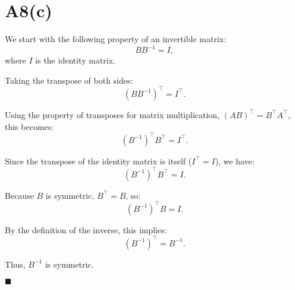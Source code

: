 \documentclass{article}
\begin{document}
\section*{A8(c)}

We start with the following property of an invertible matrix:
\[
B B^{-1} = I,
\]
where \( I \) is the identity matrix.

Taking the transpose of both sides:
\[
(B B^{-1})^\top = I^\top.
\]

Using the property of transposes for matrix multiplication, \( (AB)^\top = B^\top A^\top \), this becomes:
\[
(B^{-1})^\top B^\top = I^\top.
\]

Since the transpose of the identity matrix is itself (\( I^\top = I \)), we have:
\[
(B^{-1})^\top B^\top = I.
\]

Because \( B \) is symmetric, \( B^\top = B \), so:
\[
(B^{-1})^\top B = I.
\]

By the definition of the inverse, this implies:
\[
(B^{-1})^\top = B^{-1}.
\]

Thus, \( B^{-1} \) is symmetric.

\hfill\(\blacksquare\)
\end{document}
